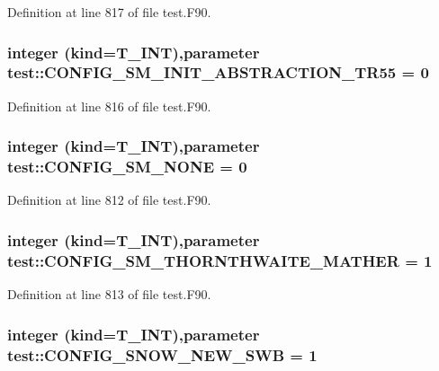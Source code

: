 Definition at line 817 of file test.F90.

\hypertarget{namespacetest_a8021cee63a2d97e255d88e15f412eb56}{
\subsubsection[{CONFIG\_\-SM\_\-INIT\_\-ABSTRACTION\_\-TR55}]{\setlength{\rightskip}{0pt plus 5cm}integer (kind={\bf T\_\-INT}),parameter {\bf test::CONFIG\_\-SM\_\-INIT\_\-ABSTRACTION\_\-TR55} = 0}}
\label{namespacetest_a8021cee63a2d97e255d88e15f412eb56}


Definition at line 816 of file test.F90.

\hypertarget{namespacetest_af5783c9f337e9b31e7749b7148302fe7}{
\subsubsection[{CONFIG\_\-SM\_\-NONE}]{\setlength{\rightskip}{0pt plus 5cm}integer (kind={\bf T\_\-INT}),parameter {\bf test::CONFIG\_\-SM\_\-NONE} = 0}}
\label{namespacetest_af5783c9f337e9b31e7749b7148302fe7}


Definition at line 812 of file test.F90.

\hypertarget{namespacetest_afe87139521a8c470b4594a41125b1800}{
\subsubsection[{CONFIG\_\-SM\_\-THORNTHWAITE\_\-MATHER}]{\setlength{\rightskip}{0pt plus 5cm}integer (kind={\bf T\_\-INT}),parameter {\bf test::CONFIG\_\-SM\_\-THORNTHWAITE\_\-MATHER} = 1}}
\label{namespacetest_afe87139521a8c470b4594a41125b1800}


Definition at line 813 of file test.F90.

\hypertarget{namespacetest_a04623d3a28add7da79b12fd14e1e1d7d}{
\subsubsection[{CONFIG\_\-SNOW\_\-NEW\_\-SWB}]{\setlength{\rightskip}{0pt plus 5cm}integer (kind={\bf T\_\-INT}),parameter {\bf test::CONFIG\_\-SNOW\_\-NEW\_\-SWB} = 1}}
\label{namespacetest_a04623d3a28add7da79b12fd14e1e1d7d}


